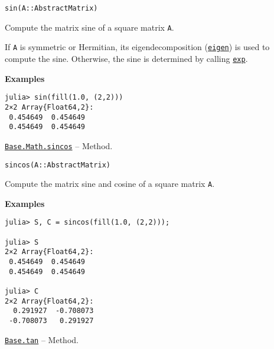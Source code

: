 \begin{adjustwidth}{2em}{0pt}


\begin{verbatim}
sin(A::AbstractMatrix)
\end{verbatim}

Compute the matrix sine of a square matrix \texttt{A}.

If \texttt{A} is symmetric or Hermitian, its eigendecomposition (\hyperlink{11056016707394839114}{\texttt{eigen}}) is used to compute the sine. Otherwise, the sine is determined by calling \hyperlink{5801729597955756107}{\texttt{exp}}.

\textbf{Examples}


\begin{verbatim}
julia> sin(fill(1.0, (2,2)))
2×2 Array{Float64,2}:
 0.454649  0.454649
 0.454649  0.454649
\end{verbatim}



\end{adjustwidth}
\hypertarget{1954885942811806470}{} 
\hyperlink{1954885942811806470}{\texttt{Base.Math.sincos}}  -- {Method.}

\begin{adjustwidth}{2em}{0pt}


\begin{verbatim}
sincos(A::AbstractMatrix)
\end{verbatim}

Compute the matrix sine and cosine of a square matrix \texttt{A}.

\textbf{Examples}


\begin{verbatim}
julia> S, C = sincos(fill(1.0, (2,2)));

julia> S
2×2 Array{Float64,2}:
 0.454649  0.454649
 0.454649  0.454649

julia> C
2×2 Array{Float64,2}:
  0.291927  -0.708073
 -0.708073   0.291927
\end{verbatim}



\end{adjustwidth}
\hypertarget{11286350735292942403}{} 
\hyperlink{11286350735292942403}{\texttt{Base.tan}}  -- {Method.}


